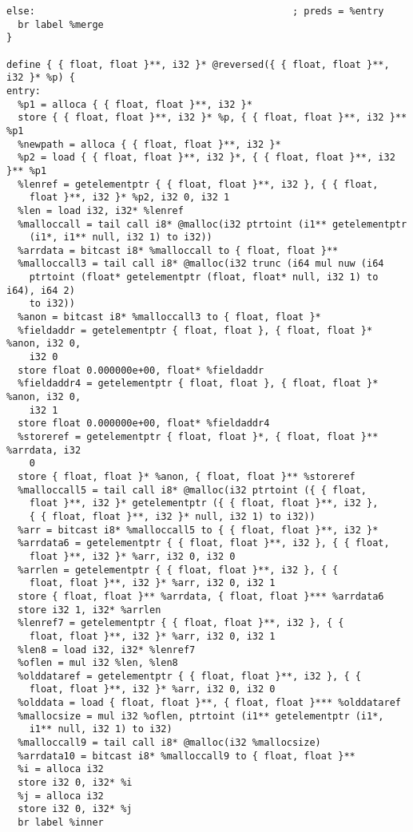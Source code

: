 \documentclass[main.tex]{subfiles}
\begin{document}
{\begin{lstlisting}
else:                                             ; preds = %entry
  br label %merge
}

define { { float, float }**, i32 }* @reversed({ { float, float }**, i32 }* %p) {
entry:
  %p1 = alloca { { float, float }**, i32 }*
  store { { float, float }**, i32 }* %p, { { float, float }**, i32 }** %p1
  %newpath = alloca { { float, float }**, i32 }*
  %p2 = load { { float, float }**, i32 }*, { { float, float }**, i32 }** %p1
  %lenref = getelementptr { { float, float }**, i32 }, { { float, 
    float }**, i32 }* %p2, i32 0, i32 1
  %len = load i32, i32* %lenref
  %malloccall = tail call i8* @malloc(i32 ptrtoint (i1** getelementptr
    (i1*, i1** null, i32 1) to i32))
  %arrdata = bitcast i8* %malloccall to { float, float }**
  %malloccall3 = tail call i8* @malloc(i32 trunc (i64 mul nuw (i64 
    ptrtoint (float* getelementptr (float, float* null, i32 1) to i64), i64 2) 
    to i32))
  %anon = bitcast i8* %malloccall3 to { float, float }*
  %fieldaddr = getelementptr { float, float }, { float, float }* %anon, i32 0, 
    i32 0
  store float 0.000000e+00, float* %fieldaddr
  %fieldaddr4 = getelementptr { float, float }, { float, float }* %anon, i32 0,
    i32 1
  store float 0.000000e+00, float* %fieldaddr4
  %storeref = getelementptr { float, float }*, { float, float }** %arrdata, i32
    0
  store { float, float }* %anon, { float, float }** %storeref
  %malloccall5 = tail call i8* @malloc(i32 ptrtoint ({ { float, 
    float }**, i32 }* getelementptr ({ { float, float }**, i32 }, 
    { { float, float }**, i32 }* null, i32 1) to i32))
  %arr = bitcast i8* %malloccall5 to { { float, float }**, i32 }*
  %arrdata6 = getelementptr { { float, float }**, i32 }, { { float,
    float }**, i32 }* %arr, i32 0, i32 0
  %arrlen = getelementptr { { float, float }**, i32 }, { { 
    float, float }**, i32 }* %arr, i32 0, i32 1
  store { float, float }** %arrdata, { float, float }*** %arrdata6
  store i32 1, i32* %arrlen
  %lenref7 = getelementptr { { float, float }**, i32 }, { { 
    float, float }**, i32 }* %arr, i32 0, i32 1
  %len8 = load i32, i32* %lenref7
  %oflen = mul i32 %len, %len8
  %olddataref = getelementptr { { float, float }**, i32 }, { { 
    float, float }**, i32 }* %arr, i32 0, i32 0
  %olddata = load { float, float }**, { float, float }*** %olddataref
  %mallocsize = mul i32 %oflen, ptrtoint (i1** getelementptr (i1*,
    i1** null, i32 1) to i32)
  %malloccall9 = tail call i8* @malloc(i32 %mallocsize)
  %arrdata10 = bitcast i8* %malloccall9 to { float, float }**
  %i = alloca i32
  store i32 0, i32* %i
  %j = alloca i32
  store i32 0, i32* %j
  br label %inner


\end{lstlisting}}
\end{document}
